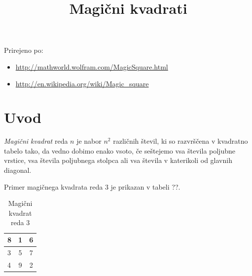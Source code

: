 \documentclass[a4paper,12pt]{article}
\title{Magični kvadrati}
\date{}
\begin{document}
\maketitle

Prirejeno po:

\begin{itemize}
   \item \url{http://mathworld.wolfram.com/MagicSquare.html}
   \item \url{http://en.wikipedia.org/wiki/Magic_square}
\end{itemize}

\tableofcontents

\newpage

\section{Uvod}

   \emph{Magični kvadrat} reda \(n\) je nabor \(n^2\) različnih števil,
   ki so razvrščena v kvadratno tabelo tako, da vedno dobimo enako vsoto,
   če seštejemo vsa števila poljubne vrstice, vsa števila poljubnega
   stolpca ali vsa števila v katerikoli od glavnih diagonal.

Primer magičnega kvadrata reda 3 je prikazan v tabeli ??. %
\begin{table}[h]
   \centering
   \caption{Magični kvadrat reda 3}
   \label{table: mag3}
      \begin{tabular}{|l|c|c|}
   8 & 1 & 6 \\\hline
   3 & 5 & 7 \\\hline
   4 & 9 & 2 \\\hline
      \end{tabular}
\end{table}
\end{document}
